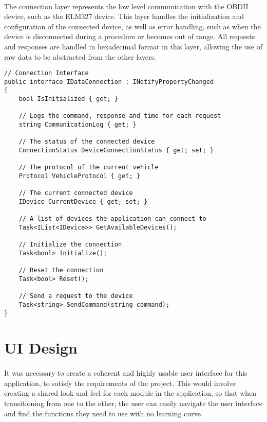 	\paragraph{}{
	The connection layer represents the low level communication with the OBDII device, such as the ELM327 device. This layer handles the initialization and configuration of the connected device, as well as error handling, such as when the device is disconnected during a procedure or becomes out of range. All requests and responses are handled in hexadecimal format in this layer, allowing the use of raw data to be abstracted from the other layers.
	\\
	\begin{lstlisting}
// Connection Interface
public interface IDataConnection : INotifyPropertyChanged
{	
	bool IsInitialized { get; }

	// Logs the command, response and time for each request
	string CommunicationLog { get; }

	// The status of the connected device
    ConnectionStatus DeviceConnectionStatus { get; set; }

	// The protocol of the current vehicle
	Protocol VehicleProtocol { get; }

	// The current connected device
    IDevice CurrentDevice { get; set; }

	// A list of devices the application can connect to
	Task<IList<IDevice>> GetAvailableDevices();

	// Initialize the connection
	Task<bool> Initialize();	

	// Reset the connection
	Task<bool> Reset();

	// Send a request to the device
    Task<string> SendCommand(string command);
}
	\end{lstlisting}
	}

\section{UI Design}
	\paragraph{}{
	It was necessary to create a coherent and highly usable user interface for this application, to satisfy the requirements of the project. This would involve creating a shared look and feel for each module in the application, so that when transitioning from one to the other, the user can easily navigate the user interface and find the functions they need to use with no learning curve.
	}	
